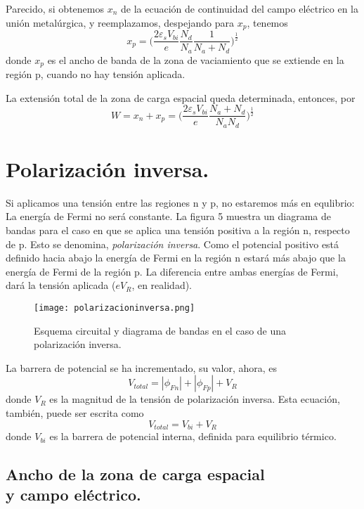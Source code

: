 \documentclass[12pt,a4paper]{article}
\begin{document}
Parecido, si obtenemos $x_{n}$ de la ecuación de continuidad del campo eléctrico en la unión metalúrgica, y reemplazamos, despejando para $x_{p}$, tenemos
\[ x_{p}= \bigg( \frac{2 \varepsilon _{s}V_{bi}}{e} \frac{N_{d}}{N_{a}} \frac{1}{N_{a}+N_{d}} \bigg)^{\frac{1}{2}} \]
donde $x_{p}$ es el ancho de banda de la zona de vaciamiento que se extiende en la región p, cuando no hay tensión aplicada.

La extensión total de la zona de carga espacial queda determinada, entonces, por
\[ W = x_{n}+x_{p} = \bigg( \frac{2 \varepsilon _{s}V_{bi}}{e} \frac{N_{a}+N_{d}}{N_{a}N_{d}} \bigg)^{\frac{1}{2}} \]

\section{Polarización inversa.}

Si aplicamos una tensión entre las regiones n y p, no estaremos más en equlibrio: La energía de Fermi no será constante. La figura 5 muestra un diagrama de bandas para el caso en que se aplica una tensión positiva a la región n, respecto de p. Esto se denomina, \emph{polarización inversa}. Como el potencial positivo está definido hacia abajo la energía de Fermi en la región n estará más abajo que la energía de Fermi de la región p. La diferencia entre ambas energías de Fermi, dará la tensión aplicada ($eV_{R}$, en realidad).

\begin{figure}[ht!]
\begin{center}
\texttt{[image: polarizacioninversa.png]}
\caption{Esquema circuital y diagrama de bandas en el caso de una polarización inversa.}
\end{center}
\end{figure}

La barrera de potencial se ha incrementado, su valor, ahora, es
\[ V_{total}=|\phi _{Fn}| + |\phi _{Fp}| + V_{R} \]
donde $V_{R}$ es la magnitud de la tensión de polarización inversa. Esta ecuación, también, puede ser escrita como
\[ V_{total}=V_{bi} + V_{R} \]
donde $V_{bi}$ es la barrera de potencial interna, definida para equilibrio térmico.

\subsection{Ancho de la zona de carga espacial\\ y campo eléctrico.}
\end{document}
